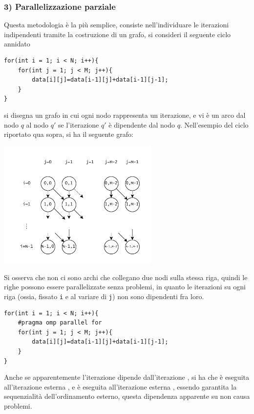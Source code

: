 \documentclass[10pt, letterpaper]{report}
\begin{document}
\subsubsection{3) Parallelizzazione parziale}
Questa metodologia è la più semplice, consiste nell'individuare le iterazioni indipendenti tramite la costruzione di un grafo, si consideri il seguente ciclo annidato 
\begin{lstlisting}[style=CStyle]
for(int i = 1; i < N; i++){
    for(int j = 1; j < M; j++){
        data[i][j]=data[i-1][j]+data[i-1][j-1];
    }
}
\end{lstlisting}
si disegna un grafo in cui ogni nodo rappresenta un iterazione, e vi è un arco dal nodo $q$ al nodo $q'$ se l'iterazione $q'$ è dipendente dal nodo $q$. Nell'esempio del ciclo riportato qua sopra, si ha il seguente grafo:\begin{center}
    \includegraphics[width=0.6\textwidth ]{images/grafoIterazioni.drawio.pdf}
\end{center}
Si osserva che non ci sono archi che collegano due nodi sulla stessa riga, quindi le righe possono essere parallelizzate senza problemi, in quanto le iterazioni su ogni riga (ossia, fissato \texttt{i} e al variare di \texttt{j}) non sono dipendenti fra loro.
\begin{lstlisting}[style=CStyle]
for(int i = 1; i < N; i++){
    #pragma omp parallel for 
    for(int j = 1; j < M; j++){
        data[i][j]=data[i-1][j]+data[i-1][j-1];
    }
}
\end{lstlisting}
Anche se apparentemente l'iterazione  dipende dall'iterazione , si ha che  è eseguita all'iterazione esterna , e   è eseguita all'iterazione esterna , essendo garantita la sequenzialità dell'ordinamento esterno, questa dipendenza apparente su  non causa problemi.
\end{document}
